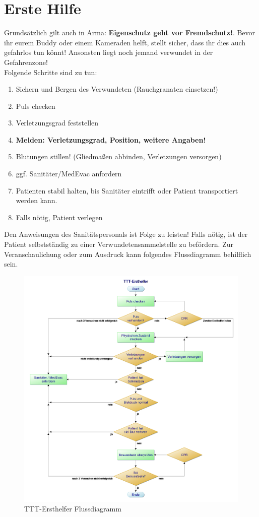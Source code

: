 \newpage
\section{Erste Hilfe}
Grundsätzlich gilt auch in Arma: \textbf{Eigenschutz geht vor Fremdschutz!}. Bevor ihr eurem Buddy oder einem Kameraden helft, stellt sicher, dass ihr dies auch gefahrlos tun könnt! Ansonsten liegt noch jemand verwundet in der Gefahrenzone!\\
Folgende Schritte sind zu tun:
\begin{enumerate}
	\item Sichern und Bergen des Verwundeten (Rauchgranaten einsetzen!)
	\item Puls checken
	\item Verletzungsgrad feststellen
	\item \textbf{Melden: Verletzungsgrad, Position, weitere Angaben!}
	\item Blutungen stillen! (Gliedmaßen abbinden, Verletzungen versorgen)
	\item ggf. Sanitäter/MedEvac anfordern
	\item Patienten stabil halten, bis Sanitäter eintrifft oder Patient transportiert werden kann.
	\item Falls nötig, Patient verlegen
\end{enumerate}
Den Anweisungen des Sanitätspersonals ist Folge zu leisten! Falls nötig, ist der Patient selbstständig zu einer Verwundetensammelstelle zu befördern.
Zur Veranschaulichung oder zum Ausdruck kann folgendes Flussdiagramm behilflich sein.
\begin{figure}[htbp]
		\centering
			\includegraphics[width=15cm]{./img/grundlagen/ersteHilfe/TTT-Ersthelfer.png}
			\caption{TTT-Ersthelfer Flussdiagramm}
\end{figure}
